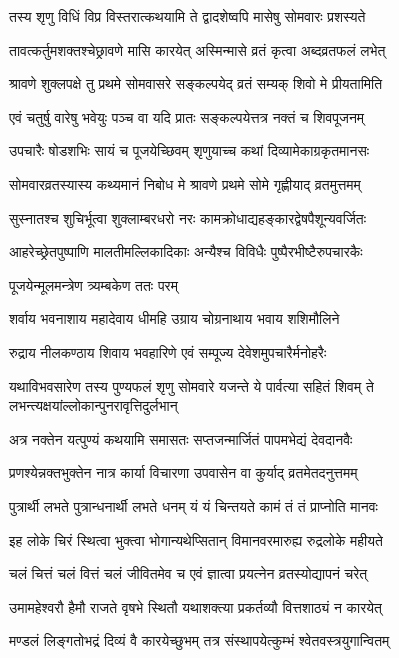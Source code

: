 \twolineshloka
{तस्य शृणु विधिं विप्र विस्तरात्कथयामि ते}
{द्वादशेष्वपि मासेषु सोमवारः प्रशस्यते} %

\twolineshloka
{तावत्कर्तुमशक्तश्चेछ्रावणे मासि कारयेत्}
{अस्मिन्मासे व्रतं कृत्वा अब्दव्रतफलं लभेत्} %

\twolineshloka
{श्रावणे शुक्लपक्षे तु प्रथमे सोमवासरे}
{सङ्कल्पयेद् व्रतं सम्यक् शिवो मे प्रीयतामिति} %

\twolineshloka
{एवं चतुर्षु वारेषु भवेयुः पञ्च वा यदि}
{प्रातः सङ्कल्पयेत्तत्र नक्तं च शिवपूजनम्} %

\twolineshloka
{उपचारैः षोडशभिः सायं च पूजयेच्छिवम्}
{शृणुयाच्च कथां दिव्यामेकाग्रकृतमानसः} %

\twolineshloka
{सोमवारव्रतस्यास्य कथ्यमानं निबोध मे}
{श्रावणे प्रथमे सोमे गृह्णीयाद् व्रतमुत्तमम्} %

\twolineshloka
{सुस्नातश्च शुचिर्भूत्वा शुक्लाम्बरधरो नरः}
{कामक्रोधाद्यहङ्कारद्वेषपैशून्यवर्जितः} %

\twolineshloka
{आहरेच्छ्रेतपुष्पाणि मालतीमल्लिकादिकाः}
{अन्यैश्च विविधैः पुष्पैरभीष्टैरुपचारकैः} %

\onelineshloka
{पूजयेन्मूलमन्त्रेण त्र्यम्बकेण ततः परम्} %

\twolineshloka
{शर्वाय भवनाशाय महादेवाय धीमहि}
{उग्राय चोग्रनाथाय भवाय शशिमौलिने} %

\twolineshloka
{रुद्राय नीलकण्ठाय शिवाय भवहारिणे}
{एवं सम्पूज्य देवेशमुपचारैर्मनोहरैः} %


\threelineshloka
{यथाविभवसारेण तस्य पुण्यफलं शृणु}
{सोमवारे यजन्ते ये पार्वत्या सहितं शिवम्}
{ते लभन्त्यक्षयांल्लोकान्पुनरावृत्तिदुर्लभान्} %

\twolineshloka
{अत्र नक्तेन यत्पुण्यं कथयामि समासतः}
{सप्तजन्मार्जितं पापमभेद्यं देवदानवैः} %

\twolineshloka
{प्रणश्येन्नक्तभुक्तेन नात्र कार्या विचारणा}
{उपवासेन वा कुर्याद् व्रतमेतदनुत्तमम्} %

\twolineshloka
{पुत्रार्थी लभते पुत्रान्धनार्थी लभते धनम्}
{यं यं चिन्तयते कामं तं तं प्राप्नोति मानवः} %

\twolineshloka
{इह लोके चिरं स्थित्वा भुक्त्वा भोगान्यथेप्सितान्}
{विमानवरमारुह्य रुद्रलोके महीयते} %

\twolineshloka
{चलं चित्तं चलं वित्तं चलं जीवितमेव च}
{एवं ज्ञात्वा प्रयत्नेन व्रतस्योद्यापनं चरेत्} %

\twolineshloka
{उमामहेश्वरौ हैमौ राजते वृषभे स्थितौ}
{यथाशक्त्या प्रकर्तव्यौ वित्तशाठ्यं न कारयेत्} %

\twolineshloka
{मण्डलं लिङ्गतोभद्रं दिव्यं वै कारयेच्छुभम्}
{तत्र संस्थापयेत्कुम्भं श्वेतवस्त्रयुगान्वितम्} %

